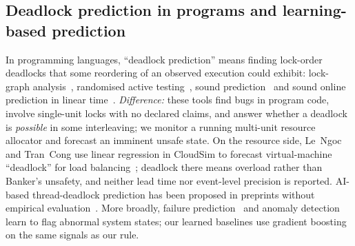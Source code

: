 \documentclass[conference]{IEEEtran}
\begin{document}
\subsection{Deadlock prediction in programs and learning-based prediction}
In programming languages, ``deadlock prediction'' means finding lock-order deadlocks that some reordering of an observed execution could exhibit: lock-graph analysis~\cite{Bensalem2006}, randomised active testing~\cite{Joshi2009}, sound prediction~\cite{Kalhauge2018} and sound online prediction in linear time~\cite{Tunc2023}. \emph{Difference:} these tools find bugs in program code, involve single-unit locks with no declared claims, and answer whether a deadlock is \emph{possible} in some interleaving; we monitor a running multi-unit resource allocator and forecast an imminent unsafe state. On the resource side, Le~Ngoc and Tran~Cong use linear regression in CloudSim to forecast virtual-machine ``deadlock'' for load balancing~\cite{LeNgoc2023}; deadlock there means overload rather than Banker's unsafety, and neither lead time nor event-level precision is reported. AI-based thread-deadlock prediction has been proposed in preprints without empirical evaluation~\cite{Oluwaseyi2024}. More broadly, failure prediction~\cite{Salfner2010} and anomaly detection~\cite{Chandola2009} learn to flag abnormal system states; our learned baselines use gradient boosting~\cite{Friedman2001} on the same signals as our rule.
\end{document}

